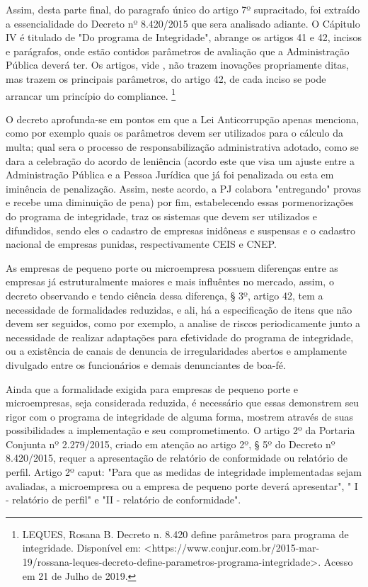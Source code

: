  Assim, desta parte final, do paragrafo único do artigo 7º supracitado, foi extraído a essencialidade do Decreto nº 8.420/2015 que sera analisado adiante. O Cápitulo IV é titulado de "Do programa de Integridade", abrange os artigos 41 e 42, incisos e parágrafos, onde estão contidos parâmetros de avaliação que a Administração Pública deverá ter. Os artigos, vide \cite{DecetoCometarios}, não trazem inovações propriamente ditas, mas trazem os principais parâmetros, do artigo 42, de cada inciso se pode arrancar um princípio do compliance. \footnote{LEQUES, Rosana B. Decreto n. 8.420 define parâmetros para 
programa de integridade. Disponível em: <https://www.conjur.com.br/2015-mar-19/rossana-leques-decreto-define-parametros-programa-integridade>. Acesso em 21 de Julho de 2019.}

O decreto aprofunda-se em pontos em que a Lei Anticorrupção apenas menciona, como por exemplo quais os parâmetros devem ser utilizados para o cálculo da multa; qual sera o processo de responsabilização administrativa adotado, como se dara a celebração do acordo de leniência (acordo este que visa um ajuste entre a Administração Pública e a Pessoa Jurídica que já foi penalizada ou esta em iminência de penalização. Assim, neste acordo, a PJ colabora "entregando" provas e recebe uma diminuição de pena) por fim, estabelecendo essas pormenorizações do programa de integridade, traz os sistemas que devem ser utilizados e difundidos, sendo eles o cadastro de empresas inidôneas e suspensas e o cadastro nacional de empresas punidas, respectivamente CEIS e CNEP. 

As empresas de pequeno porte ou microempresa possuem diferenças entre as empresas já estruturalmente maiores e mais influêntes no mercado, assim, o decreto observando e tendo ciência dessa diferença, § 3º, artigo 42, tem a necessidade de formalidades reduzidas, e ali, há a especificação de itens que não devem ser seguidos, como por exemplo, a analise de riscos periodicamente junto a necessidade de realizar adaptações para efetividade do programa de integridade, ou a existência de canais de denuncia de irregularidades abertos e amplamente divulgado entre os funcionários  e demais denunciantes de boa-fé.

Ainda que a formalidade exigida para empresas de pequeno porte e microempresas, seja considerada reduzida, é necessário que essas demonstrem seu rigor com o programa de integridade de alguma forma, mostrem através de suas possibilidades a implementação e seu comprometimento. O artigo 2º da Portaria Conjunta nº 2.279/2015, criado em atenção ao artigo 2º, § 5º do Decreto nº 8.420/2015, requer a apresentação de relatório de conformidade ou relatório de perfil. Artigo 2º caput: "Para que as medidas de integridade implementadas sejam avaliadas, a microempresa ou a empresa de pequeno porte deverá apresentar", "  I - relatório de perfil" e "II - relatório de conformidade". 

